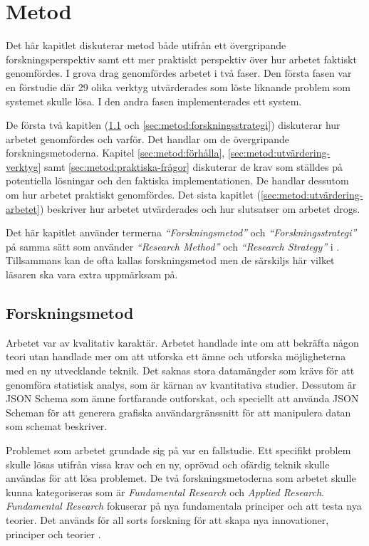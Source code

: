 \chapter{Metod}
\label{sec:metod}

Det här kapitlet diskuterar metod både utifrån ett övergripande forskningsperspektiv samt ett mer praktiskt perspektiv över hur arbetet faktiskt genomfördes. I grova drag genomfördes arbetet i två faser. Den första fasen var en förstudie där 29 olika verktyg utvärderades som löste liknande problem som systemet skulle lösa. I den andra fasen implementerades ett system.

De första två kapitlen (\ref{sec:metod:forskningsmetod} och \ref{sec:metod:forskningsstrategi}) diskuterar hur arbetet genomfördes och varför. Det handlar om de övergripande forskningsmetoderna. Kapitel \ref{sec:metod:förhålla}, \ref{sec:metod:utvärdering-verktyg} samt \ref{sec:metod:praktiska-frågor} diskuterar de krav som ställdes på potentiella lösningar och den faktiska implementationen. De handlar dessutom om hur arbetet praktiskt genomfördes. Det sista kapitlet (\ref{sec:metod:utvärdering-arbetet}) beskriver hur arbetet utvärderades och hur slutsatser om arbetet drogs.

Det här kapitlet använder termerna \textit{``Forskningsmetod''} och \textit{``Forskningsstrategi''} på samma sätt som \citeauthor{Hakansson} använder \textit{``Research Method''} och \textit{``Research Strategy''} i \textit{} \cite{Hakansson}. Tillsammans kan de ofta kallas forskningsmetod men de särskiljs här vilket läsaren ska vara extra uppmärksam på.

\section{Forskningsmetod}
\label{sec:metod:forskningsmetod}
Arbetet var av kvalitativ karaktär. Arbetet handlade inte om att bekräfta någon teori utan handlade mer om att utforska ett ämne och utforska möjligheterna med en ny utvecklande teknik. Det saknas stora datamängder som krävs för att genomföra statistisk analys, som är kärnan av kvantitativa studier. Dessutom är JSON Schema som ämne fortfarande outforskat, och speciellt att använda JSON Scheman för att generera grafiska användargränssnitt för att manipulera datan som schemat beskriver.

Problemet som arbetet grundade sig på var en fallstudie. Ett specifikt problem skulle lösas utifrån vissa krav och en ny, oprövad och ofärdig teknik skulle användas för att lösa problemet. De två forskningsmetoderna som arbetet skulle kunna kategoriseras som är \textit{Fundamental Research} och \textit{Applied Research}. \textit{Fundamental Research} fokuserar på nya fundamentala principer och att testa nya teorier. Det används för all sorts forskning för att skapa nya innovationer, principer och teorier \cite{Hakansson}.

